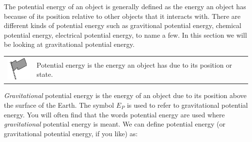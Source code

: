       
      \label{m38784*id66142}The potential energy of an object is generally defined as the energy an object has because of its position relative to other objects that it interacts with. There are different kinds of potential energy such as gravitional potential energy, chemical potential energy, electrical potential energy, to name a few. In this section we will be looking at gravitational potential energy.\par 
\label{m38784*fhsst!!!underscore!!!id907}\begin{definition}
	  \begin{tabular*}{15 cm}{m{15 mm}m{}}
	\hspace*{-50pt}  \includegraphics[width=0.5in]{col11305.imgs/psflag2.png}   & \Definition{   \label{id2552726}\textbf{ Potential energy }} { \label{m38784*meaningfhsst!!!underscore!!!id907}
      \label{m38784*id66155}Potential energy is the energy an object has due to its position or state. \par 
       } 
      \end{tabular*}
      \end{definition}

      \label{m38784*id66167}\textsl{Gravitational} potential energy is the energy of an object due to its position above the surface of the Earth. The symbol \begin{math}{E}_{P}\end{math} is used to refer to gravitational potential energy. You will often find that the words potential energy are used where \textsl{gravitational} potential energy is meant. We can define potential energy (or gravitational potential energy, if you like) as:\par 
      \label{m38784*uid45}\nopagebreak\noindent{}
    
